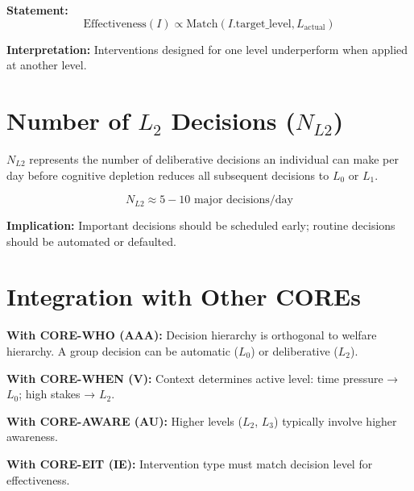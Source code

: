 \begin{tcolorbox}[colback=gray!5!white, colframe=gray!75!black,
    title=Axiom HIE-4: Level-Intervention Match]
\textbf{Statement:}
\begin{equation}
\text{Effectiveness}(I) \propto \text{Match}(I.\text{target\_level}, L_{\text{actual}})
\end{equation}

\textbf{Interpretation:} Interventions designed for one level underperform when
applied at another level.
\end{tcolorbox}

\section{Number of $L_2$ Decisions ($N_{L2}$)}
\label{sec:hier-NL2}

\begin{definition}[$N_{L2}$ Capacity]
$N_{L2}$ represents the number of deliberative decisions an individual can make
per day before cognitive depletion reduces all subsequent decisions to $L_0$ or $L_1$.
\end{definition}

\begin{equation}
N_{L2} \approx 5-10 \text{ major decisions/day}
\end{equation}

\textbf{Implication:} Important decisions should be scheduled early;
routine decisions should be automated or defaulted.

\section{Integration with Other COREs}

\begin{tcolorbox}[colback=yellow!5!white, colframe=yellow!75!black,
    title=Integration: CORE-HIERARCHY $\leftrightarrow$ Other COREs]
\textbf{With CORE-WHO (AAA):}
Decision hierarchy is orthogonal to welfare hierarchy. A group decision can be
automatic ($L_0$) or deliberative ($L_2$).

\textbf{With CORE-WHEN (V):}
Context determines active level: time pressure → $L_0$; high stakes → $L_2$.

\textbf{With CORE-AWARE (AU):}
Higher levels ($L_2$, $L_3$) typically involve higher awareness.

\textbf{With CORE-EIT (IE):}
Intervention type must match decision level for effectiveness.
\end{tcolorbox}

